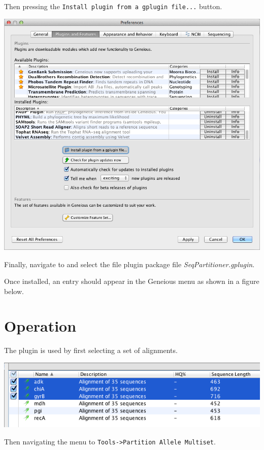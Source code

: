 \documentclass[12pt,letterpaper]{article}
\begin{document}
\hfill

Then pressing the \texttt{Install plugin from a gplugin file...} button.

\hfill

\includegraphics[resolution=130]{plugins_dialog.png}

\hfill

Finally, navigate to and select the file plugin package file
\textit{SeqPartitioner.gplugin}.

Once installed, an entry should appear in the Geneious menu as shown in a figure
below.

\section{Operation}
The plugin is used by first selecting a set of alignments.

\hfill

\includegraphics[resolution=120]{alignment_selection.png}

\hfill

Then navigating the menu to \texttt{Tools->Partition Allele Multiset}.
\end{document}
